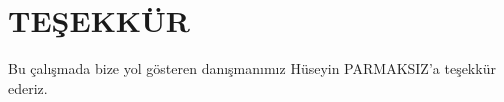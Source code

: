 \section*{TEŞEKKÜR}

Bu çalışmada bize yol gösteren danışmanımız Hüseyin PARMAKSIZ'a teşekkür ederiz.
